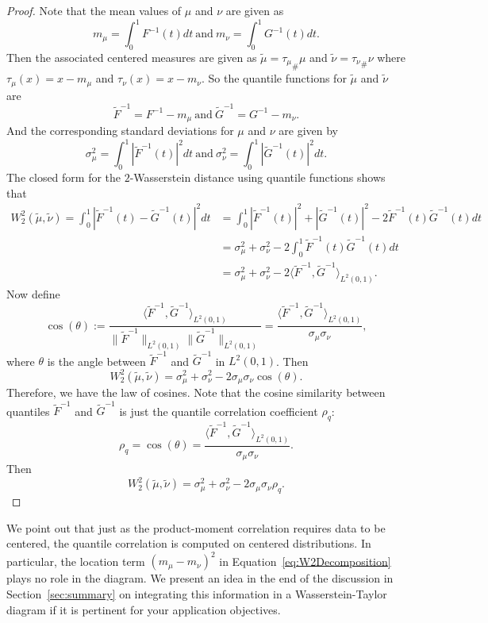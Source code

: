 \documentclass{amsart}
\numberwithin{equation}{section}
\theoremstyle{plain}
\theoremstyle{definition}
\begin{document}
\begin{proof}
Note that the mean values of $\mu$ and $\nu$ are given as
$$
m_\mu = \int_0^1 F^{-1}(t)  dt \ \text{and} \ m_\nu = \int_0^1 G^{-1}(t) dt.
$$
Then the associated centered measures are given as $   \widetilde{\mu} = {\tau_\mu}_\# \mu $  and $ \widetilde{\nu} =  {\tau_\nu}_\# \nu$
where $\tau_\mu(x) = x -m_\mu$ and $\tau_\nu(x) = x -m_\nu$. So the quantile functions for $\widetilde{\mu}$ and $ \widetilde{\nu}$ are
$$
\widetilde{F}^{-1}= F^{-1} - m_\mu \ \text{and} \  \widetilde{G}^{-1} = G^{-1} - m_\nu.
$$
And the corresponding standard deviations for $\mu$ and $\nu$ are given by
$$
\sigma_\mu^2 = \int_0^1 |\widetilde{F}^{-1}(t)|^2 dt \ \text{and} \ \sigma_\nu^2 = \int_0^1 |\widetilde{G}^{-1}(t)|^2 dt.
$$ 
The closed form for the $2$-Wasserstein distance using quantile functions shows that
\[
\begin{aligned}
    W_2^2(\widetilde{\mu}, \widetilde{\nu}) = \int_0^1 |\widetilde{F}^{-1}(t) - \widetilde{G}^{-1}(t)|^2 dt &=  \int_0^1 |\widetilde{F}^{-1}(t)|^2 + |\widetilde{G}^{-1}(t)|^2 -2\widetilde{F}^{-1}(t)\widetilde{G}^{-1}(t)dt \\
    & = \sigma_\mu^2 + \sigma_\nu^2 -2 \int_0^1 \widetilde{F}^{-1}(t)\widetilde{G}^{-1}(t)dt \\
    & = \sigma_\mu^2 + \sigma_\nu^2 -2 \langle \widetilde{F}^{-1}, \widetilde{G}^{-1}\rangle_{L^2(0,1)}. 
\end{aligned}
\]
Now define  
$$
\cos (\theta) := \frac{\langle \widetilde{F}^{-1}, \widetilde{G}^{-1}\rangle_{L^2(0,1)}}{\| \widetilde{F}^{-1}\|_{L^2(0,1)} \| \widetilde{G}^{-1}\|_{L^2(0,1)}} = \frac{\langle \widetilde{F}^{-1}, \widetilde{G}^{-1}\rangle_{L^2(0,1)}}{\sigma_\mu \sigma_\nu},
$$
where $\theta$ is the angle between $\widetilde{F}^{-1}$ and $\widetilde{G}^{-1}$ in $L^2(0,1)$. 
Then 
\begin{equation*}
    W_2^2(\widetilde{\mu}, \widetilde{\nu})  = \sigma_\mu^2 + \sigma_\nu^2 -2 \sigma_\mu \sigma_\nu \cos (\theta).
\end{equation*}
Therefore, we have the law of cosines. 
Note that the cosine similarity between quantiles $\widetilde{F}^{-1}$ and $\widetilde{G}^{-1}$ is just the quantile correlation coefficient $\rho_q$:
$$
\rho_q = \cos (\theta) = \frac{\langle \widetilde{F}^{-1}, \widetilde{G}^{-1}\rangle_{L^2(0,1)} }{\sigma_\mu \sigma_\nu}.
$$
Then
\begin{equation*}
    W_2^2(\widetilde{\mu}, \widetilde{\nu})  = \sigma_\mu^2 + \sigma_\nu^2 -2 \sigma_\mu \sigma_\nu \rho_q.
\end{equation*}
\end{proof}
We point out that just as the product-moment correlation requires data to be centered, the quantile correlation is computed on centered distributions.
In particular, the location term $(m_\mu - m_\nu)^2$ in Equation~\eqref{eq:W2Decomposition} plays no role in the diagram.
We present an idea in the end of the discussion in Section~\ref{sec:summary} on integrating this information in a Wasserstein-Taylor diagram if it is pertinent for your application objectives.
\end{document}
